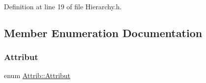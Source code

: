 Definition at line 19 of file Hierarchy.\+h.



\subsection{Member Enumeration Documentation}
\mbox{\label{classAttrib_a69e171d7cc6417835a5a306d3c764235}} 
\subsubsection{\texorpdfstring{Attribut}{Attribut}}
{\footnotesize\ttfamily enum \hyperlink{classAttrib_a69e171d7cc6417835a5a306d3c764235}{Attrib\+::\+Attribut}\hspace{0.3cm}{\ttfamily [inherited]}}

